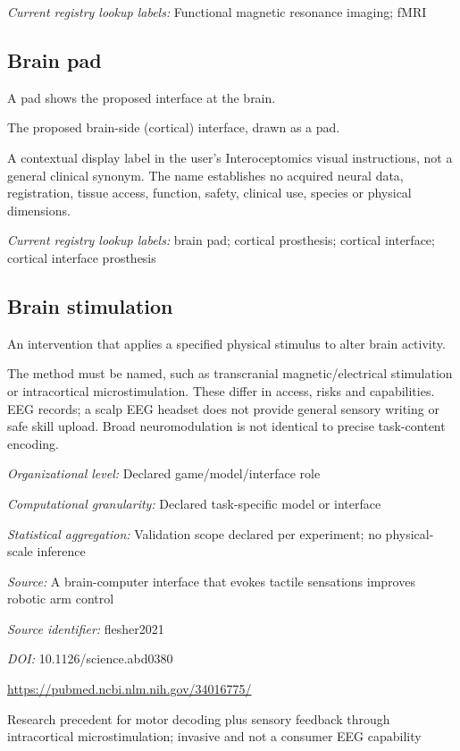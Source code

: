 \noindent\textit{Current registry lookup labels:} Functional magnetic resonance imaging; fMRI\par

\subsection*{Brain pad}
\noindent A pad shows the proposed interface at the brain.\par
\noindent The proposed brain-side (cortical) interface, drawn as a pad.\par
\noindent A contextual display label in the user's Interoceptomics visual instructions, not a general clinical synonym. The name establishes no acquired neural data, registration, tissue access, function, safety, clinical use, species or physical dimensions.\par

\noindent\textit{Current registry lookup labels:} brain pad; cortical prosthesis; cortical interface; cortical interface prosthesis\par

\begin{samepage}
\subsection*{Brain stimulation}
\noindent An intervention that applies a specified physical stimulus to alter brain activity.\par
\end{samepage}
\noindent The method must be named, such as transcranial magnetic/electrical stimulation or intracortical microstimulation. These differ in access, risks and capabilities. EEG records; a scalp EEG headset does not provide general sensory writing or safe skill upload. Broad neuromodulation is not identical to precise task-content encoding.\par
\noindent\textit{Organizational level:} Declared game/model/interface role\par
\noindent\textit{Computational granularity:} Declared task-specific model or interface\par
\begin{samepage}
\noindent\textit{Statistical aggregation:} Validation scope declared per experiment; no physical-scale inference\par\nopagebreak[4]

\end{samepage}
\noindent\textit{Source:} A brain-computer interface that evokes tactile sensations improves robotic arm control\par
\noindent\textit{Source identifier:} flesher2021\par
\noindent\textit{DOI:} 10.1126/science.abd0380\par
\noindent\url{https://pubmed.ncbi.nlm.nih.gov/34016775/}\par
\noindent Research precedent for motor decoding plus sensory feedback through intracortical microstimulation; invasive and not a consumer EEG capability\par


